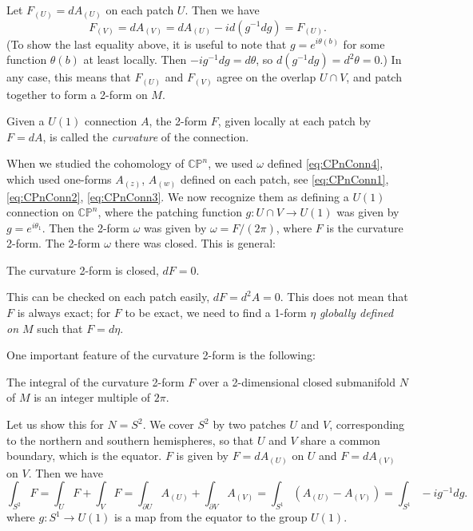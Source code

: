 \documentclass[12pt]{article}
\numberwithin{equation}{section}
\theoremstyle{remark}
\def\CP{\mathbb{CP}}
\begin{document}
Let $F_{(U)}=dA_{(U)}$ on each patch $U$.
Then we have \begin{equation}
F_{(V)}=dA_{(V)}=dA_{(U)} - i d(g^{-1} d g) = F_{(U)}.
\end{equation}
(To show the last equality above, 
it is useful to note that $g=e^{i\theta(b)}$ for some function $\theta(b)$
at least locally.
Then $-ig^{-1}dg = d\theta$, so $d(g^{-1}dg)=d^2\theta=0$.)
In any case, this means that $F_{(U)}$ and $F_{(V)}$ agree on the overlap $U\cap V$, and 
patch together to form a 2-form on $M$.
\begin{notation}
  Given a $U(1)$ connection $A$, 
the 2-form $F$, given locally at each patch by $F=dA$, is called the \emph{curvature} of the connection.
\end{notation}

When we studied the cohomology of $\CP^n$, we used $\omega$ defined \eqref{eq:CPnConn4},
which used one-forms $A_{(z)}$, $A_{(w)}$ defined on each patch, see  \eqref{eq:CPnConn1},  \eqref{eq:CPnConn2},  \eqref{eq:CPnConn3}.
We now recognize them as defining a $U(1)$ connection on $\CP^n$, where the patching function $g:U\cap V\to U(1)$
was given by $g = e^{i\theta_1}$.
Then the 2-form $\omega$ was  given by $\omega = F/(2\pi)$, where $F$ is the curvature 2-form.
The 2-form $\omega$ there was closed. This is general:
\begin{proposition}
The curvature 2-form is closed, $dF=0$.
\end{proposition}
This can be checked on each patch easily, $dF=d^2A=0$.
This does not mean that $F$ is always exact; for $F$ to be exact, 
we need to find a 1-form $\eta$ \emph{globally defined on $M$} 
such that $F=d\eta$.

One important feature of the curvature 2-form is the following:
\begin{proposition}
The integral of the curvature 2-form $F$ over a 2-dimensional closed submanifold $N$ of $M$ is an integer multiple of $2\pi$.
\end{proposition}
Let us show this for $N=S^2$.
We cover $S^2$ by two patches $U$ and $V$, corresponding to the northern and southern hemispheres,
so that $U$ and $V$ share a common boundary, which is the equator.
$F$ is given by $F=dA_{(U)}$ on $U$ and $F=dA_{(V)}$ on $V$.
Then we have \begin{equation}
  \int_{S^2} F = \int_{U} F+\int_V F
  = \int_{\partial U} A_{(U)} + \int_{\partial V} A_{(V)}
  = \int_{S^1} (A_{(U)}-A_{(V)})
  =\int_{S^1} -i g^{-1} dg.
\end{equation}
where $g:S^1\to U(1)$ is a map from the equator to the group $U(1)$.
\end{document}
